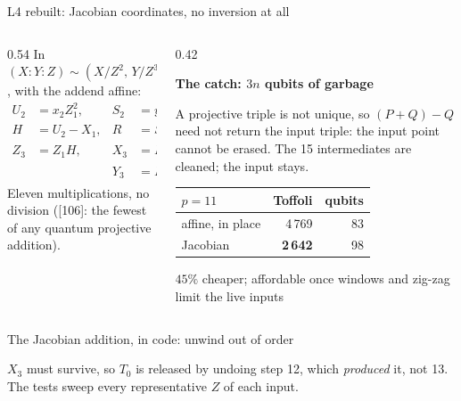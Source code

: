 \documentclass[aspectratio=169,11pt]{beamer}
\newcommand{\peachtitle}[1]{{\bfseries\color{cverm}#1}\par\vskip1mm}
\newcommand{\code}[2][]{}
\begin{document}
\begin{frame}{L4 rebuilt: Jacobian coordinates, no inversion at all}
  \begin{columns}[T]
    \begin{column}{0.54\textwidth}
      In $(X\!:\!Y\!:\!Z)\sim(X/Z^2,\,Y/Z^3)$, with the addend affine:
      \vskip-1mm
      \[ \begin{aligned} U_2&=x_2Z_1^2, & S_2&=y_2Z_1^3,\\ H&=U_2-X_1, & R&=S_2-Y_1,\\ Z_3&=Z_1H, & X_3&=R^2-H^3-2X_1H^2,\\ && Y_3&=R(X_1H^2-X_3)-Y_1H^3 . \end{aligned} \]
      Eleven multiplications, no division ([106]: the fewest of any quantum projective addition).
    \end{column}
    \begin{column}{0.42\textwidth}
      \begin{peachblock}[fontupper=\small]\peachtitle{The catch: $3n$ qubits of garbage}
        A projective triple is not unique, so $(P+Q)-Q$ need not return the input triple: the input point cannot be erased. The 15 intermediates are cleaned; the input stays.
      \end{peachblock}
      \centering\footnotesize
      \renewcommand{\arraystretch}{1.08}
      \begin{tabular}{@{}lrr@{}}
        \toprule
        $p=11$ & Toffoli & qubits \\
        \midrule
        affine, in place & 4\,769 & 83 \\
        Jacobian & \textbf{2\,642} & 98 \\
        \bottomrule
      \end{tabular}\par
      {\scriptsize $45\%$ cheaper; affordable once windows and zig-zag limit the live inputs}
    \end{column}
  \end{columns}
\end{frame}

\begin{frame}[fragile]{The Jacobian addition, in code: unwind out of order}
  \code[basicstyle=\ttfamily\fontsize{7.6}{8.8}\selectfont]{jacobian.py}
  {\small $X_3$ must survive, so $T_0$ is released by undoing step 12, which \emph{produced} it, not 13. The tests sweep every representative $Z$ of each input.}
\end{frame}
\end{document}

